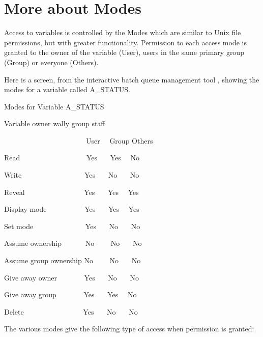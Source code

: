 \section{More about Modes}
Access to variables is controlled by the Modes which are similar to Unix file permissions, but with greater functionality. Permission to each
access mode is granted to the owner of the variable (User), users in the same primary group (Group) or everyone (Others).

Here is a screen, from the interactive batch queue management tool \BtqName{}, showing the modes for a variable called A\_STATUS.

\begin{exparasmall}

Modes for Variable {\textasciigrave}A\_STATUS{\textquotesingle}

Variable owner wally group staff

\ \ \ \ \ \ \ \ \ \ \ \ \ \ \ \ \ \ \ \ \ \ \ User \ \ Group Others

Read \ \ \ \ \ \ \ \ \ \ \ \ \ \ \ \ \ \ Yes \ \ \ Yes \ \ No

Write \ \ \ \ \ \ \ \ \ \ \ \ \ \ \ \ \ Yes \ \ \ No \ \ \ No

Reveal \ \ \ \ \ \ \ \ \ \ \ \ \ \ \ \ Yes \ \ \ Yes \ \ Yes

Display mode \ \ \ \ \ \ \ \ \ \ Yes \ \ \ Yes \ \ Yes

Set mode \ \ \ \ \ \ \ \ \ \ \ \ \ \ Yes \ \ \ No \ \ \ No

Assume ownership \ \ \ \ \ \ No \ \ \ \ No \ \ \ No

Assume group ownership No \ \ \ \ No \ \ \ No

Give away owner \ \ \ \ \ \ \ Yes \ \ \ No \ \ \ No

Give away group \ \ \ \ \ \ \ Yes \ \ \ Yes \ \ No

Delete \ \ \ \ \ \ \ \ \ \ \ \ \ \ \ \ Yes \ \ \ No \ \ \ No

\end{exparasmall}

The various modes give the following type of access when permission is granted:

